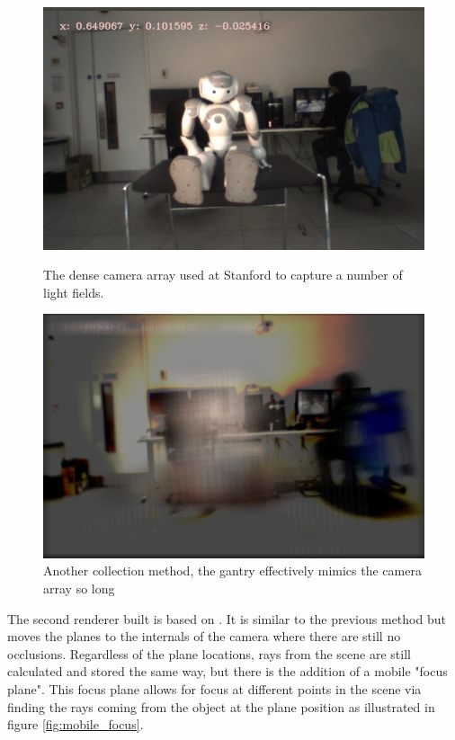 \documentclass[12pt]{report}
\begin{document}
\begin{figure}[!ht]
	\centering
	\begin{minipage}{0.45\textwidth}
		\centering
		\includegraphics[scale=0.30]{nau_occluding.png}
		\caption{The dense camera array used at Stanford to capture a number of light fields.}
		\label{fig:nau_occluding}
	\end{minipage}\hfill
	\begin{minipage}{0.45\textwidth}
		\centering
		\includegraphics[scale=0.30]{seethrough_nau.png}
		\caption{Another collection method, the gantry effectively mimics the camera array so long}
		\label{fig:seethrough_nau}
	\end{minipage}
\end{figure}

The second renderer built is based on \cite{Isaksen01}. It is similar to the previous method but moves the planes to the internals of the camera where there are still no occlusions. Regardless of the plane locations, rays from the scene are still calculated and stored the same way, but there is the addition of a mobile "focus plane". This focus plane allows for focus at different points in the scene via finding the rays coming from the object at the plane position as illustrated in figure \ref{fig:mobile_focus}.
\end{document}
